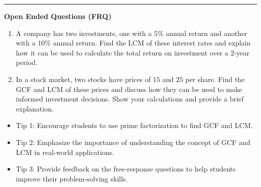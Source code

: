 \documentclass[10pt]{article}
\begin{document}
\vspace{-0.2cm}
\hrule
\vspace{0.2cm}
\textbf{\small Open Ended Questions (FRQ)}
\begin{enumerate}[label=\textbf{Q\arabic*.}, start=9, itemsep=5pt, topsep=0pt]

  \item \small A company has two investments, one with a $5\%$ annual return and another with a $10\%$ annual return. Find the LCM of these interest rates and explain how it can be used to calculate the total return on investment over a $2$-year period. \vspace{2cm}

  \item \small In a stock market, two stocks have prices of $15$ and $25$ per share. Find the GCF and LCM of these prices and discuss how they can be used to make informed investment decisions. Show your calculations and provide a brief explanation. \vspace{2cm}

\end{enumerate}

\vfill

\begin{tcolorbox}[colback=blue!5, colframe=mainblue!50, title=\small \textbf{Chef's Tips}, fonttitle=\bfseries, bottom=1mm]
\begin{itemize}[noitemsep, topsep=2pt, leftmargin=0.5cm]
  \item \scriptsize Tip 1: Encourage students to use prime factorization to find GCF and LCM.\item \scriptsize Tip 2: Emphasize the importance of understanding the concept of GCF and LCM in real-world applications.\item \scriptsize Tip 3: Provide feedback on the free-response questions to help students improve their problem-solving skills.
\end{itemize}
\end{tcolorbox}
\end{document}
